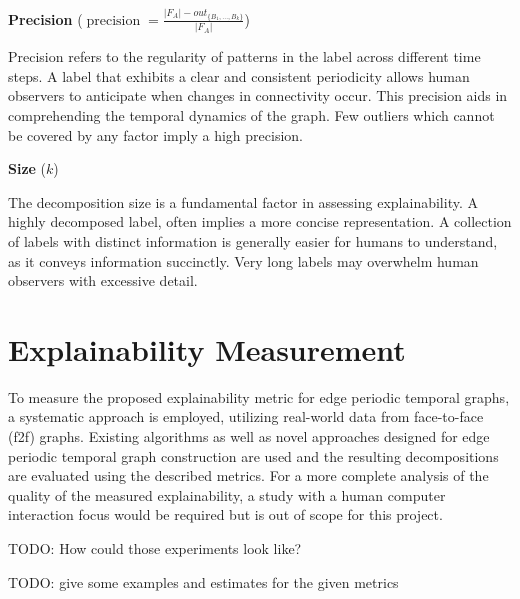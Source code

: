\textbf{Precision} ($\operatorname{precision} = \frac{|F_A| - out_{\{B_1,\dots,B_k\}}}{|F_A|}$)

Precision refers to the regularity of patterns in the label across different time steps.
A label that exhibits a clear and consistent periodicity allows human observers to anticipate when changes in connectivity occur.
This precision aids in comprehending the temporal dynamics of the graph.
Few outliers which cannot be covered by any factor imply a high precision.

\textbf{Size} ($k$)

The decomposition size is a fundamental factor in assessing explainability.
A highly decomposed label, often implies a more concise representation.
A collection of labels with distinct information is generally easier for humans to understand, as it conveys information succinctly.
Very long labels may overwhelm human observers with excessive detail.


\section{Explainability Measurement}

To measure the proposed explainability metric for edge periodic temporal graphs, a systematic approach is employed, utilizing real-world data from face-to-face (f2f) graphs.
Existing algorithms as well as novel approaches designed for edge periodic temporal graph construction are used and the resulting decompositions are evaluated using the described metrics.
For a more complete analysis of the quality of the measured explainability, a study with a human computer interaction focus would be required but is out of scope for this project.

TODO: How could those experiments look like?

TODO: give some examples and estimates for the given metrics